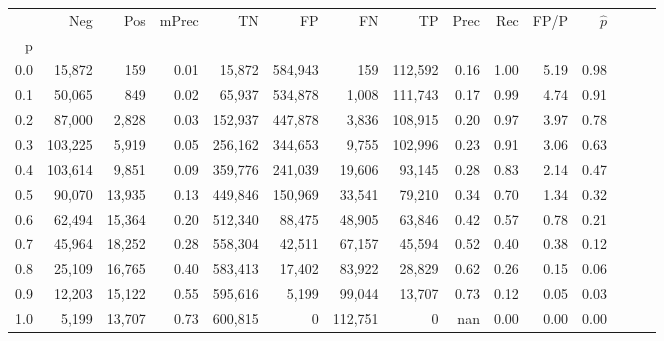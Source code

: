 \begin{tabular}{rrrrrrrrrrrrrrr}
\toprule
{} &      Neg &     Pos & mPrec &       TN &       FP &       FN &       TP &  Prec &   Rec &  FP/P & $\hat{p}$ \\
p   &          &         &       &          &          &          &          &       &       &       &           \\
\midrule
0.0 &   15,872 &     159 &  0.01 &   15,872 &  584,943 &      159 &  112,592 &  0.16 &  1.00 &  5.19 &      0.98 \\
0.1 &   50,065 &     849 &  0.02 &   65,937 &  534,878 &    1,008 &  111,743 &  0.17 &  0.99 &  4.74 &      0.91 \\
0.2 &   87,000 &   2,828 &  0.03 &  152,937 &  447,878 &    3,836 &  108,915 &  0.20 &  0.97 &  3.97 &      0.78 \\
0.3 &  103,225 &   5,919 &  0.05 &  256,162 &  344,653 &    9,755 &  102,996 &  0.23 &  0.91 &  3.06 &      0.63 \\
0.4 &  103,614 &   9,851 &  0.09 &  359,776 &  241,039 &   19,606 &   93,145 &  0.28 &  0.83 &  2.14 &      0.47 \\
0.5 &   90,070 &  13,935 &  0.13 &  449,846 &  150,969 &   33,541 &   79,210 &  0.34 &  0.70 &  1.34 &      0.32 \\
0.6 &   62,494 &  15,364 &  0.20 &  512,340 &   88,475 &   48,905 &   63,846 &  0.42 &  0.57 &  0.78 &      0.21 \\
0.7 &   45,964 &  18,252 &  0.28 &  558,304 &   42,511 &   67,157 &   45,594 &  0.52 &  0.40 &  0.38 &      0.12 \\
0.8 &   25,109 &  16,765 &  0.40 &  583,413 &   17,402 &   83,922 &   28,829 &  0.62 &  0.26 &  0.15 &      0.06 \\
0.9 &   12,203 &  15,122 &  0.55 &  595,616 &    5,199 &   99,044 &   13,707 &  0.73 &  0.12 &  0.05 &      0.03 \\
1.0 &    5,199 &  13,707 &  0.73 &  600,815 &        0 &  112,751 &        0 &   nan &  0.00 &  0.00 &      0.00 \\
\bottomrule
\end{tabular}
